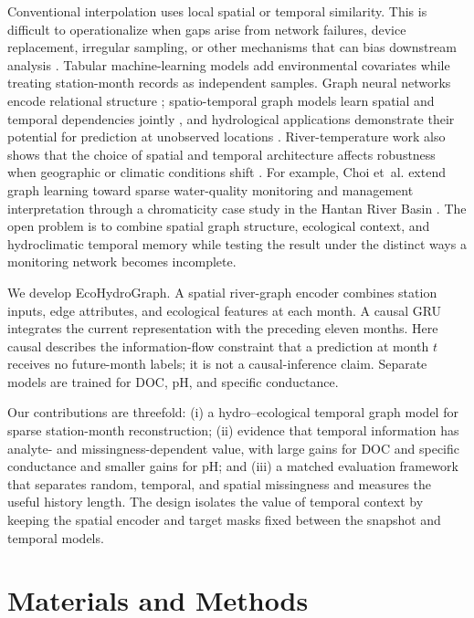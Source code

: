 \documentclass[11pt]{article}
\begin{document}
Conventional interpolation uses local spatial or temporal similarity. This is difficult to operationalize when gaps arise from network failures, device replacement, irregular sampling, or other mechanisms that can bias downstream analysis \citep{zhang2022missing,pazo2024bayesian}. Tabular machine-learning models add environmental covariates while treating station-month records as independent samples. Graph neural networks encode relational structure \citep{kipf2017,hamilton2017}; spatio-temporal graph models learn spatial and temporal dependencies jointly \citep{yu2018stgcn}, and hydrological applications demonstrate their potential for prediction at unobserved locations \citep{sun2021hydro}. River-temperature work also shows that the choice of spatial and temporal architecture affects robustness when geographic or climatic conditions shift \citep{topp2023stream}. For example, Choi et~al. extend graph learning toward sparse water-quality monitoring and management interpretation through a chromaticity case study in the Hantan River Basin \citep{choi2026water}. The open problem is to combine spatial graph structure, ecological context, and hydroclimatic temporal memory while testing the result under the distinct ways a monitoring network becomes incomplete.

We develop EcoHydroGraph. A spatial river-graph encoder combines station inputs, edge attributes, and ecological features at each month. A causal GRU \citep{cho2014} integrates the current representation with the preceding eleven months. Here causal describes the information-flow constraint that a prediction at month $t$ receives no future-month labels; it is not a causal-inference claim. Separate models are trained for DOC, pH, and specific conductance.

Our contributions are threefold: (i) a hydro--ecological temporal graph model for sparse station-month reconstruction; (ii) evidence that temporal information has analyte- and missingness-dependent value, with large gains for DOC and specific conductance and smaller gains for pH; and (iii) a matched evaluation framework that separates random, temporal, and spatial missingness and measures the useful history length. The design isolates the value of temporal context by keeping the spatial encoder and target masks fixed between the snapshot and temporal models.

\section{Materials and Methods}
\end{document}
